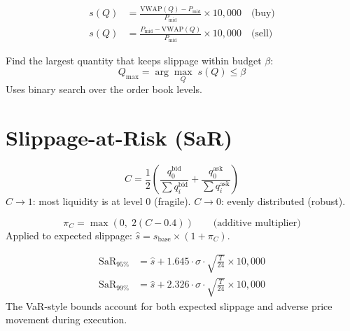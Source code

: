 \documentclass[11pt,a4paper]{article}
\begin{document}
\begin{formulabox}[title={\S9.2 — Slippage Estimate}]
\begin{align}
  s(Q) &= \frac{\text{VWAP}(Q) - P_{\text{mid}}}{P_{\text{mid}}} \times 10{,}000 \quad \text{(buy)} \\
  s(Q) &= \frac{P_{\text{mid}} - \text{VWAP}(Q)}{P_{\text{mid}}} \times 10{,}000 \quad \text{(sell)}
\end{align}
\end{formulabox}

\begin{formulabox}[title={\S9.3 — Maximum Market Order}]
Find the largest quantity that keeps slippage within budget $\beta$:
\begin{equation}
  Q_{\max} = \arg\max_{Q}\; s(Q) \leq \beta
\end{equation}
Uses binary search over the order book levels.
\end{formulabox}


\section{Slippage-at-Risk (SaR)}

\begin{formulabox}[title={\S10.1 — Book Concentration Ratio}]
\begin{equation}
  C = \frac{1}{2}\left(\frac{q_0^{\text{bid}}}{\sum q_i^{\text{bid}}} + \frac{q_0^{\text{ask}}}{\sum q_i^{\text{ask}}}\right)
\end{equation}
$C \to 1$: most liquidity is at level 0 (fragile). $C \to 0$: evenly distributed (robust).
\end{formulabox}

\begin{formulabox}[title={\S10.2 — Concentration Penalty}]
\begin{equation}
  \pi_C = \max\!\left(0,\; 2(C - 0.4)\right) \qquad \text{(additive multiplier)}
\end{equation}
Applied to expected slippage: $\hat{s} = s_{\text{base}} \times (1 + \pi_C)$.
\end{formulabox}

\begin{formulabox}[title={\S10.3 — Slippage-at-Risk}]
\begin{align}
  \text{SaR}_{95\%} &= \hat{s} + 1.645 \cdot \sigma \cdot \sqrt{\frac{T}{24}} \times 10{,}000 \\
  \text{SaR}_{99\%} &= \hat{s} + 2.326 \cdot \sigma \cdot \sqrt{\frac{T}{24}} \times 10{,}000
\end{align}
The VaR-style bounds account for both expected slippage and adverse price movement during execution.
\end{formulabox}
\end{document}
